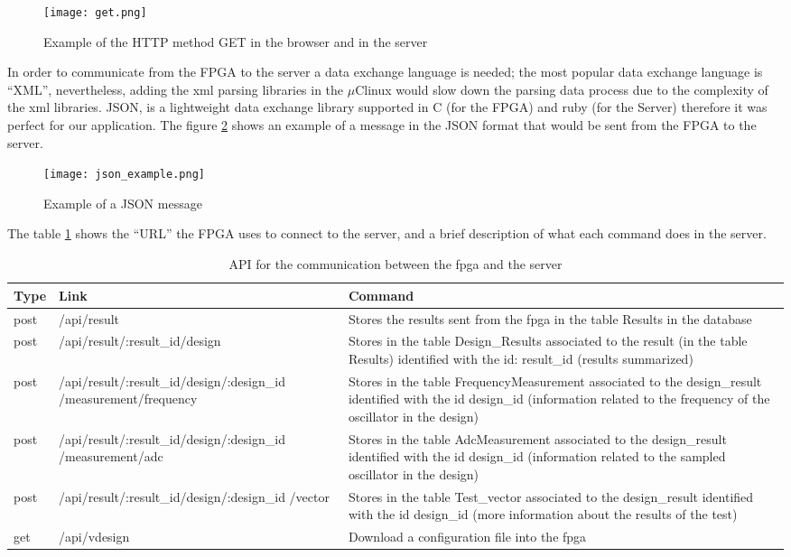 \begin{figure}[htb]
\centering
\texttt{[image: get.png]}
\caption{Example of the HTTP method GET in the browser and in the server}
\label{fig:get_example}
\end{figure}

In order to communicate from the FPGA to the server a data exchange language is needed; the most popular data exchange language is ``XML'', nevertheless, adding the xml parsing libraries in the $\mu$Clinux
would slow down the parsing data process due to the complexity of the xml libraries. JSON, is a lightweight data exchange library supported in C (for the FPGA) and ruby (for the Server) therefore it was perfect 
for our application. The figure \ref{fig:Json_message} shows an example of a message in the JSON format that would be sent from the FPGA to the server.

\begin{figure}[htb]
\centering
\texttt{[image: json\_example.png]}
\caption{Example of a JSON message}
\label{fig:Json_message}
\end{figure}

The table \ref{tab:api_server_fpga} shows the ``URL'' the FPGA uses to connect to the server, and a brief description of what each command does in the server. 

\begin{table}
\centering
    \begin{tabular}{ | l | p{7.5cm} | p{5cm}|}
    \hline
    Type & Link & Command   \\ \hline
    post & /api/result & Stores the results sent from the fpga in the table Results in the database\\ \hline
    post & /api/result/:result\_id/design & Stores in the table Design\_Results associated to the result (in the table Results) identified with the id: result\_id (results summarized)\\ \hline
    post & /api/result/:result\_id/design/:design\_id	/measurement/frequency & Stores in the table FrequencyMeasurement associated to the design\_result identified with the id design\_id (information related to the frequency of the oscillator in the design)\\ \hline
    post & /api/result/:result\_id/design/:design\_id	/measurement/adc & Stores in the table AdcMeasurement associated to the design\_result identified with the id design\_id (information related to the sampled oscillator in the design)  \\ \hline
    post & /api/result/:result\_id/design/:design\_id	/vector & Stores in the table Test\_vector associated to the design\_result identified with the id design\_id (more information about the results of the test)\\ \hline
    get & /api/vdesign & Download a configuration file into the fpga\\ \hline
    \end{tabular}
    \caption{API for the communication between the fpga and the server}
    \label{tab:api_server_fpga}
\end{table}


